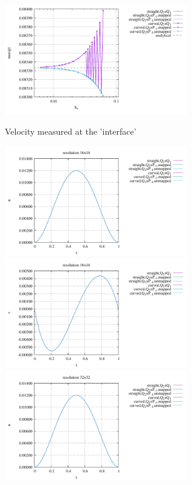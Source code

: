 \begin{center}
\includegraphics[width=8cm]{python_codes/fieldstone_25/results/doneahuerta/max_p.pdf}\\
\end{center}

\newpage
Velocity measured at the 'interface'
\begin{center}
\includegraphics[width=8cm]{python_codes/fieldstone_25/results/doneahuerta/interface_u_16.pdf}
\includegraphics[width=8cm]{python_codes/fieldstone_25/results/doneahuerta/interface_v_16.pdf}\\
\includegraphics[width=8cm]{python_codes/fieldstone_25/results/doneahuerta/interface_u_32.pdf}

\end{center}
